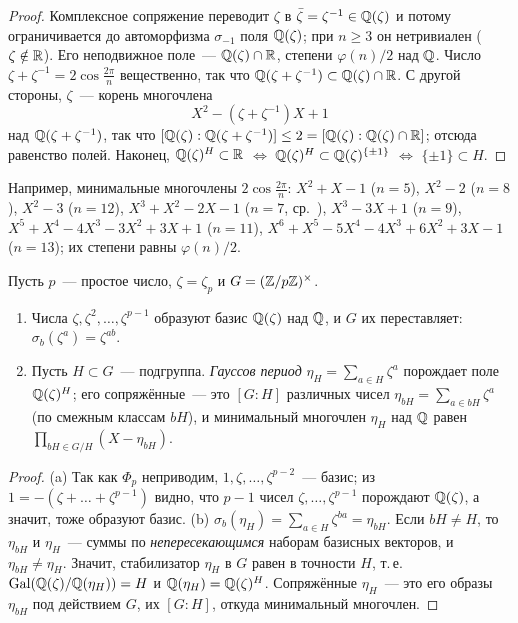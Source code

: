 \begin{proof}
Комплексное сопряжение переводит $\zeta$ в $\bar\zeta=\zeta^{-1}\in\mathbb Q(\zeta)$ и потому ограничивается до автоморфизма
$\sigma_{-1}$ поля $\mathbb Q(\zeta)$; при $n\ge3$ он нетривиален ($\zeta\notin\mathbb R$). Его неподвижное поле~--- $\mathbb Q(\zeta)\cap\mathbb R$,
степени $\varphi(n)/2$ над $\mathbb Q$. Число $\zeta+\zeta^{-1}=2\cos\frac{2\pi}n$ вещественно, так что
$\mathbb Q(\zeta+\zeta^{-1})\subset\mathbb Q(\zeta)\cap\mathbb R$. С другой стороны, $\zeta$~--- корень многочлена
\[
X^2-(\zeta+\zeta^{-1})X+1
\]
над $\mathbb Q(\zeta+\zeta^{-1})$, так что $[\mathbb Q(\zeta):\mathbb Q(\zeta+\zeta^{-1})]\le2=[\mathbb Q(\zeta):\mathbb Q(\zeta)\cap\mathbb R]$; отсюда равенство полей.
Наконец, $\mathbb Q(\zeta)^H\subset\mathbb R$ $\iff$ $\mathbb Q(\zeta)^H\subset\mathbb Q(\zeta)^{\{\pm1\}}$ $\iff$ $\{\pm1\}\subset H$.
\end{proof}

Например, минимальные многочлены $2\cos\frac{2\pi}n$: $X^2+X-1$ ($n=5$), $X^2-2$ ($n=8$), $X^2-3$ ($n=12$),
$X^3+X^2-2X-1$ ($n=7$, ср.\ ), $X^3-3X+1$ ($n=9$), $X^5+X^4-4X^3-3X^2+3X+1$ ($n=11$),
$X^6+X^5-5X^4-4X^3+6X^2+3X-1$ ($n=13$); их степени равны $\varphi(n)/2$.

\begin{proposition}
Пусть $p$~--- простое число, $\zeta=\zeta_p$ и $G=(\mathbb Z/p\mathbb Z)^\times$.
\begin{enumerate}[label=\textup{(\alph*)}]
\item Числа $\zeta,\zeta^2,\dots,\zeta^{p-1}$ образуют базис $\mathbb Q(\zeta)$ над $\mathbb Q$, и $G$ их переставляет:
$\sigma_b(\zeta^a)=\zeta^{ab}$.
\item Пусть $H\subset G$~--- подгруппа. \emph{Гауссов период} $\eta_H=\sum_{a\in H}\zeta^a$ порождает поле $\mathbb Q(\zeta)^H$; его
сопряжённые~--- это $[G:H]$ различных чисел $\eta_{bH}=\sum_{a\in bH}\zeta^a$ (по смежным классам $bH$), и минимальный
многочлен $\eta_H$ над $\mathbb Q$ равен $\prod_{bH\in G/H}(X-\eta_{bH})$.
\end{enumerate}
\end{proposition}

\begin{proof}
(a) Так как $\Phi_p$ неприводим, $1,\zeta,\dots,\zeta^{p-2}$~--- базис; из $1=-(\zeta+\dots+\zeta^{p-1})$ видно, что
$p-1$ чисел $\zeta,\dots,\zeta^{p-1}$ порождают $\mathbb Q(\zeta)$, а значит, тоже образуют базис.
(b) $\sigma_b(\eta_H)=\sum_{a\in H}\zeta^{ba}=\eta_{bH}$. Если $bH\ne H$, то $\eta_{bH}$ и $\eta_H$~--- суммы по
\emph{непересекающимся} наборам базисных векторов, и $\eta_{bH}\ne\eta_H$. Значит, стабилизатор $\eta_H$ в $G$ равен в
точности $H$, т.\,е.\ $\operatorname{Gal}(\mathbb Q(\zeta)/\mathbb Q(\eta_H))=H$ и $\mathbb Q(\eta_H)=\mathbb Q(\zeta)^H$. Сопряжённые $\eta_H$~--- это его образы
$\eta_{bH}$ под действием $G$, их $[G:H]$, откуда минимальный многочлен.
\end{proof}

